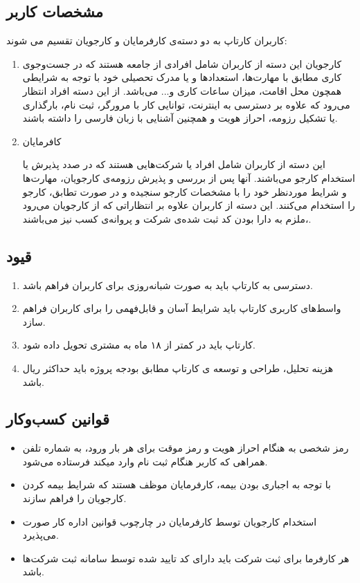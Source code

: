 \subsection{مشخصات کاربر}
کاربران کارتاپ به دو دسته‌ی کارفرمایان و کارجویان تقسیم می شوند:

\begin{enumerate}
	\item
	کارجویان
	این دسته از کاربران شامل افرادی از جامعه هستند که در جست‌وجوی کاری مطابق با مهارت‌ها، استعدادها و یا مدرک تحصیلی خود با توجه به شرایطی همچون محل اقامت، میزان ساعات کاری و... می‌باشد. از این دسته افراد انتظار می‌رود که علاوه بر دسترسی به اینترنت، توانایی کار با مرورگر، ثبت نام، بارگذاری یا تشکیل رزومه، احراز هویت و همچنین آشنایی با زبان فارسی را داشته باشند.
	\item
	کافرمایان
	
	این دسته از کاربران شامل افراد یا شرکت‌هایی هستند که در صدد پذیرش یا استخدام کارجو می‌باشند. آنها پس از بررسی و پذیرش رزومه‌ی کارجویان، مهارت‌ها و شرایط موردنظر خود را با مشخصات کارجو سنجیده و در صورت تطابق، کارجو را استخدام می‌کنند. این دسته از کاربران علاوه بر انتظاراتی که از کارجویان می‌رود ،ملزم به دارا بودن کد ثبت شده‌ی شرکت و پروانه‌ی کسب نیز می‌باشند.
\end{enumerate}

\subsection{قیود}
\begin{enumerate}
	\item
	دسترسی به کارتاپ باید به صورت شبانه‌روزی برای کاربران فراهم باشد.
	\item
	واسط‌های کاربری کارتاپ باید شرایط آسان و قابل‌فهمی را برای کاربران فراهم سازد.
	\item
	کارتاپ باید در کمتر از ۱۸ ماه به مشتری تحویل داده شود.
	\item
	هزینه تحلیل، طراحی و توسعه ی کارتاپ مطابق بودجه پروژه باید حداکثر  ریال باشد.
\end{enumerate}
\subsection{قوانین کسب‌و‌کار}
\begin{itemize}
	\item
	رمز شخصی به هنگام احراز هویت و رمز موقت برای هر بار ورود، به شماره تلفن همراهی که کاربر هنگام ثبت نام وارد میکند فرستاده می‌شود.
	\item
	با توجه به اجباری بودن بیمه، کارفرمایان موظف هستند که شرایط بیمه کردن کارجویان را فراهم سازند.
	\item
	استخدام کارجویان توسط کارفرمایان در چارچوب قوانین اداره کار صورت می‌پذیرد.
	\item
	هر کارفرما برای ثبت شرکت باید دارای کد تایید شده توسط سامانه ثبت شرکت‌ها باشد.
	
\end{itemize}
